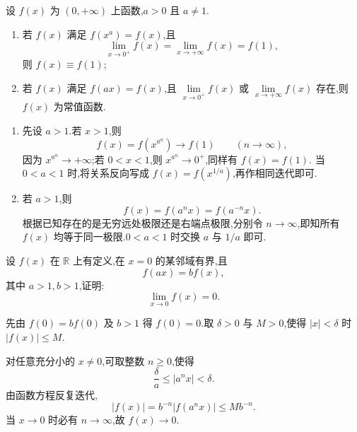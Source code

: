 \begin{example}
    设 $f(x)$ 为 $(0,+\infty)$ 上函数,$a>0$ 且 $a\neq1$.
    \begin{enumerate}
        \item 若 $f(x)$ 满足 $f(x^a)=f(x)$,且
              \[
                  \lim\limits_{x\to0^+}f(x)
                  =\lim\limits_{x\to+\infty}f(x)
                  =f(1),
              \]
              则 $f(x)\equiv f(1)$;
        \item 若 $f(x)$ 满足 $f(ax)=f(x)$,且
              $\displaystyle\lim\limits_{x\to0^+}f(x)$ 或
              $\displaystyle\lim\limits_{x\to+\infty}f(x)$ 存在,则 $f(x)$ 为常值函数.
    \end{enumerate}
\end{example}
\exampleblank

\begin{solution}
    \begin{enumerate}
        \item 先设 $a>1$.若 $x>1$,则
              \[
                  f(x)=f\left(x^{a^n}\right)\longrightarrow f(1)
                  \qquad(n\to\infty),
              \]
              因为 $x^{a^n}\to+\infty$;若 $0<x<1$,则 $x^{a^n}\to0^+$,同样有 $f(x)=f(1)$.
              当 $0<a<1$ 时,将关系反向写成 $f(x)=f\left(x^{1/a}\right)$,再作相同迭代即可.
        \item 若 $a>1$,则
              \[
                  f(x)=f(a^nx)=f(a^{-n}x).
              \]
              根据已知存在的是无穷远处极限还是右端点极限,分别令 $n\to\infty$,即知所有 $f(x)$ 均等于同一极限.$0<a<1$ 时交换 $a$ 与 $1/a$ 即可.
    \end{enumerate}
\end{solution}

\begin{example}
    设 $f(x)$ 在 $\mathbb{R}$ 上有定义,在 $x=0$ 的某邻域有界,且
    \[
        f(ax)=bf(x),
    \]
    其中 $a>1,b>1$,证明:
    \[
        \lim\limits_{x\to0}f(x)=0.
    \]
\end{example}
\exampleblank

\begin{solution}
    先由 $f(0)=bf(0)$ 及 $b>1$ 得 $f(0)=0$.取 $\delta>0$ 与 $M>0$,使得 $|x|<\delta$ 时 $|f(x)|\leq M$.

    对任意充分小的 $x\neq0$,可取整数 $n\geq0$,使得
    \[
        \dfrac{\delta}{a}\leq |a^nx|<\delta.
    \]
    由函数方程反复迭代,
    \[
        |f(x)|=b^{-n}|f(a^nx)|\leq Mb^{-n}.
    \]
    当 $x\to0$ 时必有 $n\to\infty$,故 $f(x)\to0$.
\end{solution}

